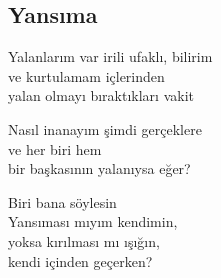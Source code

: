 \subsection{Yansıma}

Yalanlarım var irili ufaklı, bilirim \\
ve kurtulamam içlerinden \\
yalan olmayı bıraktıkları vakit

\noindent\newline
Nasıl inanayım şimdi gerçeklere \\
ve her biri hem \\
bir başkasının yalanıysa eğer?

\noindent\newline
Biri bana söylesin \\
Yansıması mıyım kendimin, \\
yoksa kırılması mı ışığın, \\
kendi içinden geçerken?